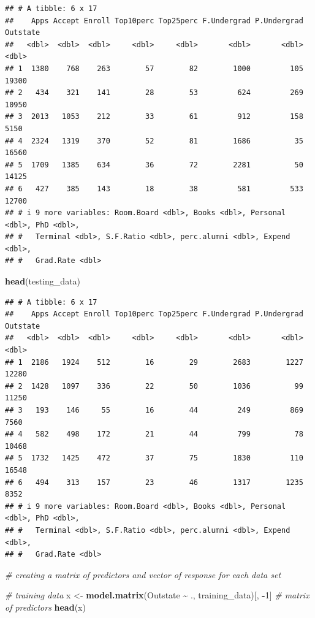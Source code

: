\documentclass[
]{article}
\newenvironment{Shaded}{\begin{snugshade}}{\end{snugshade}}
\newcommand{\CommentTok}[1]{\textcolor[rgb]{0.56,0.35,0.01}{\textit{#1}}}
\newcommand{\DecValTok}[1]{\textcolor[rgb]{0.00,0.00,0.81}{#1}}
\newcommand{\FunctionTok}[1]{\textcolor[rgb]{0.13,0.29,0.53}{\textbf{#1}}}
\newcommand{\NormalTok}[1]{#1}
\newcommand{\OtherTok}[1]{\textcolor[rgb]{0.56,0.35,0.01}{#1}}
\newcommand{\SpecialCharTok}[1]{\textcolor[rgb]{0.81,0.36,0.00}{\textbf{#1}}}
\begin{document}
\begin{verbatim}
## # A tibble: 6 x 17
##    Apps Accept Enroll Top10perc Top25perc F.Undergrad P.Undergrad Outstate
##   <dbl>  <dbl>  <dbl>     <dbl>     <dbl>       <dbl>       <dbl>    <dbl>
## 1  1380    768    263        57        82        1000         105    19300
## 2   434    321    141        28        53         624         269    10950
## 3  2013   1053    212        33        61         912         158     5150
## 4  2324   1319    370        52        81        1686          35    16560
## 5  1709   1385    634        36        72        2281          50    14125
## 6   427    385    143        18        38         581         533    12700
## # i 9 more variables: Room.Board <dbl>, Books <dbl>, Personal <dbl>, PhD <dbl>,
## #   Terminal <dbl>, S.F.Ratio <dbl>, perc.alumni <dbl>, Expend <dbl>,
## #   Grad.Rate <dbl>
\end{verbatim}

\begin{Shaded}
\begin{Highlighting}[]
\FunctionTok{head}\NormalTok{(testing\_data)}
\end{Highlighting}
\end{Shaded}

\begin{verbatim}
## # A tibble: 6 x 17
##    Apps Accept Enroll Top10perc Top25perc F.Undergrad P.Undergrad Outstate
##   <dbl>  <dbl>  <dbl>     <dbl>     <dbl>       <dbl>       <dbl>    <dbl>
## 1  2186   1924    512        16        29        2683        1227    12280
## 2  1428   1097    336        22        50        1036          99    11250
## 3   193    146     55        16        44         249         869     7560
## 4   582    498    172        21        44         799          78    10468
## 5  1732   1425    472        37        75        1830         110    16548
## 6   494    313    157        23        46        1317        1235     8352
## # i 9 more variables: Room.Board <dbl>, Books <dbl>, Personal <dbl>, PhD <dbl>,
## #   Terminal <dbl>, S.F.Ratio <dbl>, perc.alumni <dbl>, Expend <dbl>,
## #   Grad.Rate <dbl>
\end{verbatim}

\begin{Shaded}
\begin{Highlighting}[]
\CommentTok{\# creating a matrix of predictors and vector of response for each data set}

\CommentTok{\# training data}
\NormalTok{x }\OtherTok{\textless{}{-}} \FunctionTok{model.matrix}\NormalTok{(Outstate }\SpecialCharTok{\textasciitilde{}}\NormalTok{ ., training\_data)[, }\SpecialCharTok{{-}}\DecValTok{1}\NormalTok{] }\CommentTok{\# matrix of predictors}
\FunctionTok{head}\NormalTok{(x)}
\end{Highlighting}
\end{Shaded}
\end{document}
